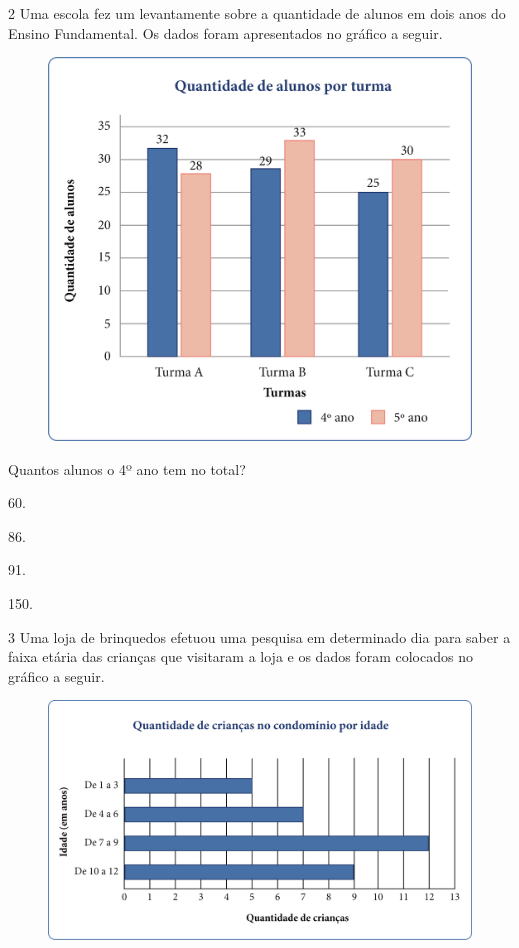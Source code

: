 \num{2} Uma escola fez um levantamente sobre a quantidade de alunos em dois anos
do Ensino Fundamental. Os dados foram apresentados no gráfico a seguir.

\begin{figure}[htpb!]
\centering
\includegraphics[width=.6\textwidth]{media/image50.png}
\end{figure}

Quantos alunos o 4º ano tem no total?

\begin{escolha}
\item
  60.
\item
  86.
\item
  91.
\item
  150.
\end{escolha}



\num{3} Uma loja de brinquedos efetuou uma pesquisa em determinado dia para
saber a faixa etária das crianças que visitaram a loja e os dados foram
colocados no gráfico a seguir.

\begin{figure}[htpb!]
\centering
\includegraphics[width=\textwidth]{media/image51.png}
\end{figure}

